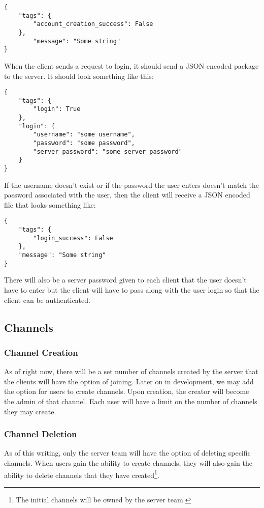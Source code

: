 \begin{lstlisting}[style=json]
{
    "tags": {
        "account_creation_success": False
    },
        "message": "Some string"
}
\end{lstlisting}
When the client sends a request to login, it should send a JSON encoded
package to the server. It should look something like this:

\begin{lstlisting}[style=json]
{
    "tags": {
        "login": True
    },
    "login": {
        "username": "some username",
        "password": "some password",
        "server_password": "some server password"
    }
}
\end{lstlisting}

If the username doesn't exist or if the password the user
enters doesn't match the password associated with the user, then the client will receive a JSON encoded file that looks something like:

\begin{lstlisting}[style=json]
{
    "tags": {
        "login_success": False
    },
    "message": "Some string"
}
\end{lstlisting}

There will also be a server password given to each client that the user doesn't have to enter but the client will have to pass along with the user login so that the client can be authenticated.

\subsection{Channels}
\subsubsection{Channel Creation}
As of right now, there will be a set number of channels created by the server that the clients will have the option of joining. Later on in development, we may add the option for users to create channels. Upon creation, the creator will become the admin of that channel. Each user will have a limit on the number of channels they may create.

\subsubsection{Channel Deletion}
As of this writing, only the server team will have the option of deleting specific channels. When users gain the ability to create channels, they will also gain the ability to delete channels that they have created\footnote{The initial channels will be owned by the server team.}.

